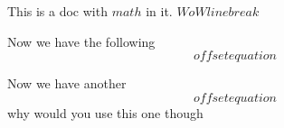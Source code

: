 

This is a doc with \(math\) in it. $ W o
W linebreak $

Now we have the following \[ offset equation \]

Now we have another $$
offset equation
$$ why would you use this one though


